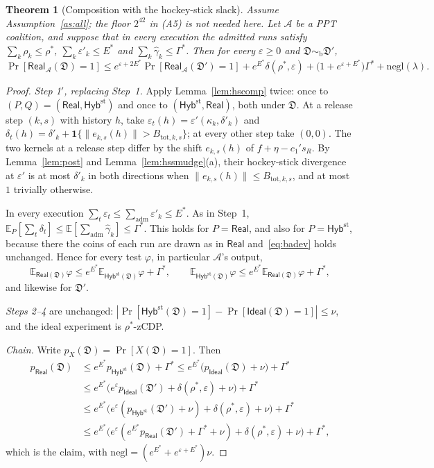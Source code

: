 \documentclass[11pt]{article}
\theoremstyle{definition}
\theoremstyle{plain}
\newtheorem{theorem}[definition]{Theorem}
\newcommand{\Ex}{\mathbb{E}}
\newcommand{\nrm}[1]{\lVert #1\rVert}
\newcommand{\negl}{\mathrm{negl}}
\newcommand{\fs}{f}
\newcommand{\bD}{\mathfrak D}
\newcommand{\Real}{\mathsf{Real}}
\newcommand{\Hyb}{\mathsf{Hyb}}
\newcommand{\Ideal}{\mathsf{Ideal}}
\newcommand{\adm}{\mathrm{adm}}
\newcommand{\simb}{\sim_{\mathrm b}}
\begin{document}
\begin{theorem}[Composition with the hockey-stick slack]\label{thm:hs}
Assume Assumption~\ref{as:all}; the floor $2^{42}$ in (A5) is not needed here. Let $\mathcal A$ be a PPT coalition, and suppose that in every execution the admitted runs satisfy $\sum_k\rho_k\le\rho^*$, $\sum_k\varepsilon'_k\le E^*$ and $\sum_k\hat\gamma_k\le\Gamma^*$. Then for every $\varepsilon\ge0$ and $\bD\simb\bD'$,
\[
  \Pr[\Real_{\mathcal A}(\bD)=1]\le e^{\varepsilon+2E^*}\Pr[\Real_{\mathcal A}(\bD')=1]+e^{E^*}\delta(\rho^*,\varepsilon)+\bigl(1+e^{\varepsilon+E^*}\bigr)\Gamma^*+\negl(\lambda).
\]
\end{theorem}
\begin{proof}
\emph{Step 1$'$, replacing Step~1.} Apply Lemma~\ref{lem:hscomp} twice: once to $(P,Q)=(\Real,\Hyb^{\mathrm{st}})$ and once to $(\Hyb^{\mathrm{st}},\Real)$, both under $\bD$. At a release step $(k,s)$ with history $h$, take $\varepsilon_t(h)=\varepsilon'(\kappa_k,\delta'_k)$ and $\delta_t(h)=\delta'_k+\mathbf 1\{\nrm{e_{k,s}(h)}>B_{\mathrm{tot},k,s}\}$; at every other step take $(0,0)$. The two kernels at a release step differ by the shift $e_{k,s}(h)$ of $\fs+\eta-c_1's_R$. By Lemma~\ref{lem:post} and Lemma~\ref{lem:hssmudge}(a), their hockey-stick divergence at $\varepsilon'$ is at most $\delta'_k$ in both directions when $\nrm{e_{k,s}(h)}\le B_{\mathrm{tot},k,s}$, and at most $1$ trivially otherwise.

In every execution $\sum_t\varepsilon_t\le\sum_{\adm}\varepsilon'_k\le E^*$. As in Step~1, $\Ex_P[\sum_t\delta_t]\le\Ex[\sum_{\adm}\hat\gamma_k]\le\Gamma^*$. This holds for $P=\Real$, and also for $P=\Hyb^{\mathrm{st}}$, because there the coins of each run are drawn as in $\Real$ and~\eqref{eq:badev} holds unchanged. Hence for every test $\varphi$, in particular $\mathcal A$'s output,
\[
  \Ex_{\Real(\bD)}\varphi\le e^{E^*}\Ex_{\Hyb^{\mathrm{st}}(\bD)}\varphi+\Gamma^*,\qquad
  \Ex_{\Hyb^{\mathrm{st}}(\bD)}\varphi\le e^{E^*}\Ex_{\Real(\bD)}\varphi+\Gamma^* ,
\]
and likewise for $\bD'$.

\emph{Steps 2--4} are unchanged: $|\Pr[\Hyb^{\mathrm{st}}(\bD)=1]-\Pr[\Ideal(\bD)=1]|\le\nu$, and the ideal experiment is $\rho^*$-zCDP.

\emph{Chain.} Write $p_X(\bD)=\Pr[X(\bD)=1]$. Then
\[
  \begin{aligned}
  p_{\Real}(\bD)&\le e^{E^*}p_{\Hyb^{\mathrm{st}}}(\bD)+\Gamma^*\le e^{E^*}\bigl(p_{\Ideal}(\bD)+\nu\bigr)+\Gamma^*\\
  &\le e^{E^*}\bigl(e^\varepsilon p_{\Ideal}(\bD')+\delta(\rho^*,\varepsilon)+\nu\bigr)+\Gamma^*\\
  &\le e^{E^*}\bigl(e^\varepsilon(p_{\Hyb^{\mathrm{st}}}(\bD')+\nu)+\delta(\rho^*,\varepsilon)+\nu\bigr)+\Gamma^*\\
  &\le e^{E^*}\bigl(e^\varepsilon(e^{E^*}p_{\Real}(\bD')+\Gamma^*+\nu)+\delta(\rho^*,\varepsilon)+\nu\bigr)+\Gamma^*,
  \end{aligned}
\]
which is the claim, with $\negl=(e^{E^*}+e^{\varepsilon+E^*})\nu$.
\end{proof}
\end{document}

